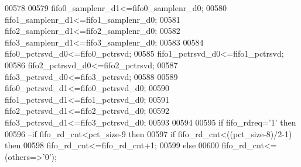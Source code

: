 \begin{DoxyCode}
00578             
00579             \textcolor{vhdlchar}{fifo0_samplenr_d1}\textcolor{vhdlchar}{<=}\textcolor{vhdlchar}{fifo0_samplenr_d0};
00580             \textcolor{vhdlchar}{fifo1_samplenr_d1}\textcolor{vhdlchar}{<=}\textcolor{vhdlchar}{fifo1_samplenr_d0};
00581             \textcolor{vhdlchar}{fifo2_samplenr_d1}\textcolor{vhdlchar}{<=}\textcolor{vhdlchar}{fifo2_samplenr_d0};
00582             \textcolor{vhdlchar}{fifo3_samplenr_d1}\textcolor{vhdlchar}{<=}\textcolor{vhdlchar}{fifo3_samplenr_d0};
00583             
00584             \textcolor{vhdlchar}{fifo0_pctrsvd_d0}\textcolor{vhdlchar}{<=}\textcolor{vhdlchar}{fifo0_pctrsvd};
00585             \textcolor{vhdlchar}{fifo1_pctrsvd_d0}\textcolor{vhdlchar}{<=}\textcolor{vhdlchar}{fifo1_pctrsvd};
00586             \textcolor{vhdlchar}{fifo2_pctrsvd_d0}\textcolor{vhdlchar}{<=}\textcolor{vhdlchar}{fifo2_pctrsvd};
00587             \textcolor{vhdlchar}{fifo3_pctrsvd_d0}\textcolor{vhdlchar}{<=}\textcolor{vhdlchar}{fifo3_pctrsvd};
00588             
00589             \textcolor{vhdlchar}{fifo0_pctrsvd_d1}\textcolor{vhdlchar}{<=}\textcolor{vhdlchar}{fifo0_pctrsvd_d0};
00590             \textcolor{vhdlchar}{fifo1_pctrsvd_d1}\textcolor{vhdlchar}{<=}\textcolor{vhdlchar}{fifo1_pctrsvd_d0};
00591             \textcolor{vhdlchar}{fifo2_pctrsvd_d1}\textcolor{vhdlchar}{<=}\textcolor{vhdlchar}{fifo2_pctrsvd_d0};
00592             \textcolor{vhdlchar}{fifo3_pctrsvd_d1}\textcolor{vhdlchar}{<=}\textcolor{vhdlchar}{fifo3_pctrsvd_d0};
00593             
00594             
00595           \textcolor{keywordflow}{if} \textcolor{vhdlchar}{fifo_rdreq}\textcolor{vhdlchar}{=}\textcolor{vhdlchar}{'}\textcolor{vhdllogic}{}\textcolor{vhdllogic}{1}\textcolor{vhdlchar}{'} \textcolor{keywordflow}{then} 
00596 \textcolor{keyword}{              --if fifo\_rd\_cnt<pct\_size-9 then }
00597               \textcolor{keywordflow}{if} \textcolor{vhdlchar}{fifo_rd_cnt}\textcolor{vhdlchar}{<}\textcolor{vhdlchar}{(}\textcolor{vhdlchar}{(}\textcolor{vhdlchar}{pct_size}\textcolor{vhdlchar}{-}\textcolor{vhdllogic}{}\textcolor{vhdllogic}{8}\textcolor{vhdlchar}{)}\textcolor{vhdlchar}{/}\textcolor{vhdllogic}{2-1}\textcolor{vhdlchar}{)} \textcolor{keywordflow}{then} 
00598                   \textcolor{vhdlchar}{fifo_rd_cnt}\textcolor{vhdlchar}{<=}\textcolor{vhdlchar}{fifo_rd_cnt}\textcolor{vhdlchar}{+}\textcolor{vhdllogic}{}\textcolor{vhdllogic}{1};
00599               \textcolor{keywordflow}{else} 
00600                   \textcolor{vhdlchar}{fifo_rd_cnt}\textcolor{vhdlchar}{<=}\textcolor{vhdlchar}{(}\textcolor{keywordflow}{others}\textcolor{vhdlchar}{=}\textcolor{vhdlchar}{>}\textcolor{vhdlchar}{'}\textcolor{vhdllogic}{}\textcolor{vhdllogic}{0}\textcolor{vhdlchar}{'}\textcolor{vhdlchar}{)};

\end{DoxyCode}
